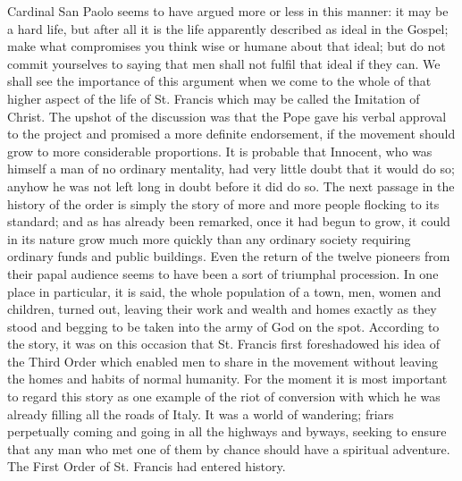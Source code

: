 \documentclass{book}
\begin{document}
Cardinal San Paolo seems to have argued more or less in this manner: it may be a hard life, but after all it is the life apparently described as ideal in the Gospel; make what compromises you think wise or humane about that ideal; but do not commit yourselves to saying that men shall not fulfil that ideal if they can. We shall see the importance of this argument when we come to the whole of that higher aspect of the life of St. Francis which may be called the Imitation of Christ. The upshot of the discussion was that the Pope gave his verbal approval to the project and promised a more definite endorsement, if the movement should grow to more considerable proportions. It is probable that Innocent, who was himself a man of no ordinary mentality, had very little doubt that it would do so; anyhow he was not left long in doubt before it did do so. The next passage in the history of the order is simply the story of more and more people flocking to its standard; and as has already been remarked, once it had begun to grow, it could in its nature grow much more quickly than any ordinary society requiring ordinary funds and public buildings. Even the return of the twelve pioneers from their papal audience seems to have been a sort of triumphal procession. In one place in particular, it is said, the whole population of a town, men, women and children, turned out, leaving their work and wealth and homes exactly as they stood and begging to be taken into the army of God on the spot. According to the story, it was on this occasion that St. Francis first foreshadowed his idea of the Third Order which enabled men to share in the movement without leaving the homes and habits of normal humanity. For the moment it is most important to regard this story as one example of the riot of conversion with which he was already filling all the roads of Italy. It was a world of wandering; friars perpetually coming and going in all the highways and byways, seeking to ensure that any man who met one of them by chance should have a spiritual adventure. The First Order of St. Francis had entered history.
\end{document}
